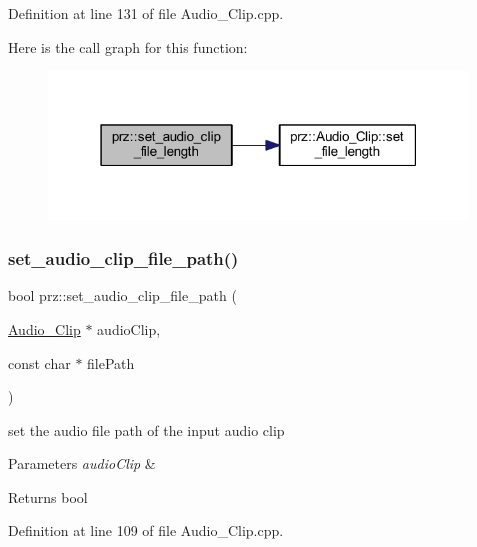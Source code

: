 Definition at line 131 of file Audio\+\_\+\+Clip.\+cpp.

Here is the call graph for this function\+:
\nopagebreak
\begin{figure}[H]
\begin{center}
\leavevmode
\includegraphics[width=316pt]{namespaceprz_a9722a82e0324e8ddf5fa0923298a8797_cgraph}
\end{center}
\end{figure}
\mbox{\label{namespaceprz_ade1afd9da96172eda2c255f074e82608}} 
\subsubsection{\texorpdfstring{set\_audio\_clip\_file\_path()}{set\_audio\_clip\_file\_path()}}
{\footnotesize\ttfamily bool prz\+::set\+\_\+audio\+\_\+clip\+\_\+file\+\_\+path (\begin{DoxyParamCaption}\item[{\mbox{\hyperlink{classprz_1_1_audio___clip}{Audio\+\_\+\+Clip}} $\ast$}]{audio\+Clip,  }\item[{const char $\ast$}]{file\+Path }\end{DoxyParamCaption})}



set the audio file path of the input audio clip 


\begin{DoxyParams}{Parameters}
{\em audio\+Clip} & \\
\hline
\end{DoxyParams}
\begin{DoxyReturn}{Returns}
bool 
\end{DoxyReturn}


Definition at line 109 of file Audio\+\_\+\+Clip.\+cpp.


